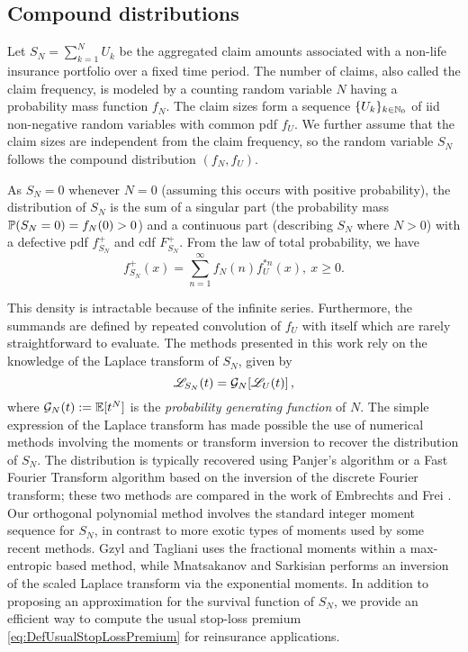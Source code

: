 \subsection{Compound distributions}

Let $S_N=\sum_{k=1}^{N}U_k$ be the aggregated claim amounts associated with a non-life insurance portfolio over a fixed time period. The number of claims, also called the claim frequency, is modeled by a counting random variable $N$ having a probability mass function $f_N$. The claim sizes form a sequence $\{U_k\}_{k\in \mathbb{N}_0}$ of iid non-negative random variables with common pdf $f_{U}$. We further assume that the claim sizes are independent from the claim frequency, so the random variable $S_N$ follows the compound distribution $(f_N,f_U)$.

As $S_N=0$ whenever $N=0$ (assuming this occurs with positive probability), the distribution of $S_N$ is the sum of a singular part (the probability mass $\operatorname{{\mathbb P}}(S_N=0)=f_N(0)>0$) and a continuous part (describing $S_N$ where $N>0$) with a defective pdf $f_{S_N}^+$ and cdf $F_{S_N}^+$. From the law of total probability, we have
\begin{equation}\label{eq:DefectivePDFCompoundDistribution}
f_{S_N}^+(x)=\sum_{n=1}^{\infty}f_N(n)f_{U}^{\ast n}(x),~x\geq0.
\end{equation}

This density is intractable because of the infinite series. Furthermore, the summands are defined by repeated convolution of $f_{U}$ with itself which are rarely straightforward to evaluate. The methods presented in this work rely on the knowledge of the Laplace transform of $S_N$, given by
\begin{equation*}\label{eq:TransformsForCompoundDistribution}
\mathscr{L}_{S_N}(t) = \mathcal{G}_N[ \mathscr{L}_{U}(t) ] \,,
\end{equation*}
where $\mathcal{G}_N(t) := \operatorname{{\mathbb E}}[t^N]$ is the \emph{probability generating function} of $N$. The simple expression of the Laplace transform has made possible the use of numerical methods involving the moments or transform inversion to recover the distribution of $S_N$. The distribution is typically recovered using Panjer's algorithm or a Fast Fourier Transform algorithm based on the inversion of the discrete Fourier transform; these two methods are compared in the work of Embrechts and Frei \cite{EmFr09}. Our orthogonal polynomial method involves the standard integer moment sequence for $S_N$, in contrast to more exotic types of moments used by some recent methods. Gzyl and Tagliani \cite{GzTa12} uses the fractional moments within a max-entropic based method, while Mnatsakanov and Sarkisian \cite{Mnatsakanov2013} performs an inversion of the scaled Laplace transform via the exponential moments. In addition to proposing an approximation for the survival function of $S_N$, we provide an efficient way to compute the usual stop-loss premium \eqref{eq:DefUsualStopLossPremium} for reinsurance applications.

